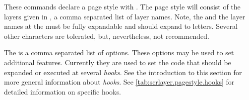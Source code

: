 \begin{Declaration}
\end{Declaration}
These commands declare a page style with . The page
style will consist of the layers given in , a comma
separated list of layer names. Note, the  and the
layer names at the  must be fully expandable and should
expand to letters. Several other characters are tolerated, but,
nevertheless, not recommended.

The  is a comma separated list of
 options. These options may be used to
set additional features. Currently they are used to set the code that should
be expanded or executed at several \emph{hooks}. See the introduction to this
section for more general information about \emph{hooks}. See
\autoref{tab:scrlayer.pagestyle.hooks} for detailed information on specific
hooks.

